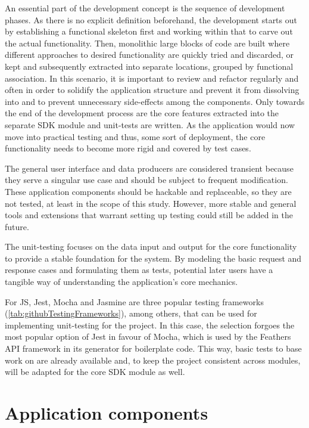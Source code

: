 An essential part of the development concept is the sequence of development phases.
As there is no explicit definition beforehand, the development starts out by establishing a functional skeleton first and working within that to carve out the actual functionality.
Then, monolithic large blocks of code are built where different approaches to desired functionality are quickly tried and discarded, or kept and subsequently extracted into separate locations, grouped by functional association.
In this scenario, it is important to review and refactor regularly and often in order to solidify the application structure and prevent it from dissolving into  and to prevent unnecessary side-effects among the components.
Only towards the end of the development process are the core features extracted into the separate \ac{SDK} module and unit-tests are written.
As the application would now move into practical testing and thus, some sort of  deployment, the core functionality needs to become more rigid and covered by test cases.

The general user interface and data producers are considered transient because they serve a singular use case and should be subject to frequent modification.
These application components should be hackable and replaceable, so they are not tested, at least in the scope of this study.
However, more stable and general tools and extensions that warrant setting up testing could still be added in the future.

The unit-testing focuses on the data input and output for the core functionality to provide a stable foundation for the system.
By modeling the basic request and response cases and formulating them as tests, potential later users have a tangible way of understanding the application's core mechanics.

For \ac{JS}, Jest, Mocha and Jasmine are three popular testing frameworks (\ref{tab:githubTestingFrameworks}), among others, that can be used for implementing unit-testing for the project.
In this case, the selection forgoes the most popular option of Jest in favour of Mocha, which is used by the Feathers \ac{API} framework in its generator for boilerplate code.
This way, basic tests to base work on are already available and, to keep the project consistent across modules, will be adapted for the core \ac{SDK} module as well.



\section{Application components}
\label{sec:application-components}

